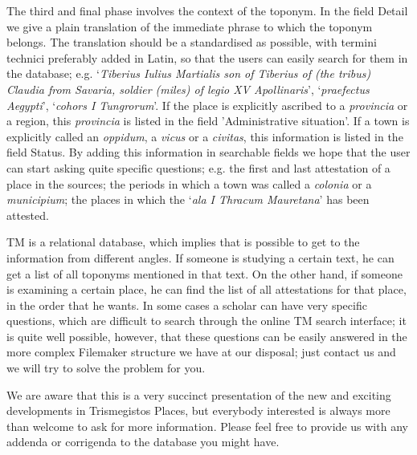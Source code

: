 \documentclass[amsthm,ebook]{saparticle}
\begin{document}
The third and final phase involves the context of the toponym. In the field Detail we give a plain translation of
the immediate phrase to which the toponym belongs. The translation should be a standardised as possible, with termini
technici preferably added in Latin, so that the users can easily search for them in the database; e.g. `\emph{Tiberius Iulius
Martialis son of Tiberius of (the tribus) Claudia from Savaria, soldier (miles) of legio XV Apollinaris}', `\emph{praefectus
Aegypti}', `\emph{cohors I Tungrorum}'. If the place is explicitly ascribed to a \emph{provincia} or a region, this \emph{provincia} is
listed in the field 'Administrative situation'. If a town is explicitly called an \emph{oppidum}, a \emph{vicus} or a \emph{civitas}, this
information is listed in the field Status. By adding this information in searchable fields we hope that the user can
start asking quite specific questions; e.g. the first and last attestation of a place in the sources; the periods in
which a town was called a \emph{colonia} or a \emph{municipium}; the places in which the `\emph{ala I Thracum Mauretana}' has been attested.

 TM is a relational database, which implies that is possible to get to the information from different angles. If
someone is studying a certain text, he can get a list of all toponyms mentioned in that text. On the other hand, if
someone is examining a certain place, he can find the list of all attestations for that place, in the order that he
wants. In some cases a scholar can have very specific questions, which are difficult to search through the online TM
search interface; it is quite well possible, however, that these questions can be easily answered in the more complex
Filemaker structure we have at our disposal; just contact us and we will try to solve the problem for you.

We are aware that this is a very succinct presentation of the new and exciting developments in Trismegistos Places,
but everybody interested is always more than welcome to ask for more information. Please feel free to provide us with
any addenda or corrigenda to the database you might have.



\end{document}
